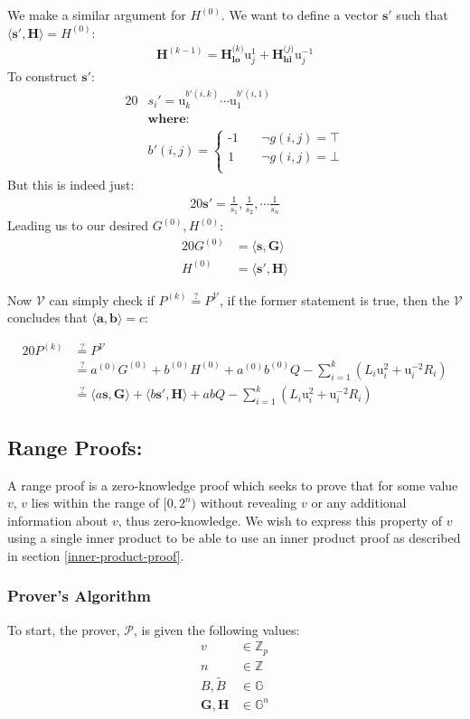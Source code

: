 \documentclass{article}
\newcommand{\eq}[1]{\begin{alignat*}{20}#1\end{alignat*}}
\newcommand{\eqn}[2]{\begin{equation}\label{#1}\begin{split}#2\end{split}\end{equation}}
\renewcommand{\vec}[1]{\boldsymbol{#1}}
\newcommand{\ran}[1]{\mathrm{#1}}
\newcommand{\V}{\mathcal{V}}
\renewcommand{\P}{\mathcal{P}}
\newcommand{\G}{\mathbb{G}}
\newcommand{\Z}{\mathbb{Z}}
\newcommand{\dotp}[2]{\langle #1, #2 \rangle}
\newcommand{\opn}[1]{\operatorname{#1}}
\newcommand{\veclo}[1]{\vec{#1_{\opn{lo}}}}
\newcommand{\vechi}[1]{\vec{#1_{\opn{hi}}}}
\newcommand{\blind}[1]{\widetilde{#1}}
\newcommand{\bB}{\blind{B}}
\begin{document}
We make a similar argument for $H^{(0)}$. We want to define a vector
$\vec{s'}$ such that $\dotp{\vec{s'}}{\vec{H}} = H^{(0)}$:
\eqn{H0}{
	\vec{H}^{(k-1)} = \veclo{H^\textit{(k)}} \ran{u}^{1}_j + \vechi{H^\textit{(j)}} \ran{u}^{-1}_j
}
To construct $\vec{s'}$:
\eq{
	&s_i' = \ran{u}^{b'(i,k)}_k \cdots \ran{u}^{b'(i,1)}_1 \\
	&\textbf{where:} \\
	&b'(i,j) = 
	\begin{cases}
		\text{-1} &\quad  \lnot g(i,j) = \top \\
		\text{1}  &\quad  \lnot g(i,j) = \bot \\
	\end{cases}
}
But this is indeed just:
\eq{
	\vec{s'} = \frac{1}{s_1}, \frac{1}{s_2}, \cdots \frac{1}{s_n}
}
Leading us to our desired $G^{(0)}, H^{(0)}$:
\eq{
	G^{(0)} &= \dotp{\vec{s}}{\vec{G}} \\
	H^{(0)} &= \dotp{\vec{s'}}{\vec{H}}
}

Now $\V$ can simply check if $P^{(k)} \stackrel{?}{=} P^{\V}$,
if the former statement is true, then the $\V$ concludes that
$\dotp{\vec{a}}{\vec{b}} = c$:

\eq{
	P^{(k)} &\stackrel{?}{=} P^{\V} \\
	        &\stackrel{?}{=} a^{(0)}G^{(0)} + b^{(0)}H^{(0)} + a^{(0)}b^{(0)}Q - \sum^k_{i=1} (L_i \ran{u}^2_i + \ran{u}^{-2}_i R_i) \\
	        &\stackrel{?}{=} \dotp{a\vec{s}}{\vec{G}} + \dotp{b\vec{s'}}{\vec{H}} + abQ - \sum^k_{i=1} (L_i \ran{u}^2_i + \ran{u}^{-2}_i R_i)
}
\subsection{Range Proofs:} \label{range-proofs}

A range proof is a zero-knowledge proof which seeks to prove that for
some value $v$, $v$ lies within the range of $[0,2^n)$ without revealing
$v$ or any additional information about $v$, thus zero-knowledge. We
wish to express this property of $v$ using a single inner product to be
able to use an inner product proof as described in section
\ref{inner-product-proof}.

\subsubsection{Prover's Algorithm}\label{prover-range-proofs}

To start, the prover, $\P$, is given the following values:
\eqn{def1}{
	v &\in \Z_p \\
	n &\in \Z\\
	B, \bB &\in \G\\
	\vec{G}, \vec{H} &\in \G^n
}
\end{document}
